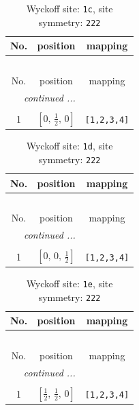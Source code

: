 \documentclass[fleqn,8pt]{jsarticle}
\begin{document}
\begin{longtable}{ccc}
\caption{Wyckoff site: {\tt 1c}, site symmetry: {\tt 222}}
 \\
 \hline \hline
No. & position & mapping \\ \hline \endfirsthead

\multicolumn{2}{l}{\tablename\ \thetable{}} \\
 \hline \hline
No. & position & mapping \\ \hline \endhead

 \hline \hline
\multicolumn{2}{r}{\footnotesize\it continued ...} \\ \endfoot

 \hline \hline
\multicolumn{2}{r}{} \\ \endlastfoot

1 & $\left[ 0,\, \frac{1}{2},\, 0 \right]$ & {\tt [1,2,3,4]} \\
\end{longtable}
\renewcommand{\arraystretch}{1.2}
\begin{longtable}{ccc}
\caption{Wyckoff site: {\tt 1d}, site symmetry: {\tt 222}}
 \\
 \hline \hline
No. & position & mapping \\ \hline \endfirsthead

\multicolumn{2}{l}{\tablename\ \thetable{}} \\
 \hline \hline
No. & position & mapping \\ \hline \endhead

 \hline \hline
\multicolumn{2}{r}{\footnotesize\it continued ...} \\ \endfoot

 \hline \hline
\multicolumn{2}{r}{} \\ \endlastfoot

1 & $\left[ 0,\, 0,\, \frac{1}{2} \right]$ & {\tt [1,2,3,4]} \\
\end{longtable}
\renewcommand{\arraystretch}{1.2}
\begin{longtable}{ccc}
\caption{Wyckoff site: {\tt 1e}, site symmetry: {\tt 222}}
 \\
 \hline \hline
No. & position & mapping \\ \hline \endfirsthead

\multicolumn{2}{l}{\tablename\ \thetable{}} \\
 \hline \hline
No. & position & mapping \\ \hline \endhead

 \hline \hline
\multicolumn{2}{r}{\footnotesize\it continued ...} \\ \endfoot

 \hline \hline
\multicolumn{2}{r}{} \\ \endlastfoot

1 & $\left[ \frac{1}{2},\, \frac{1}{2},\, 0 \right]$ & {\tt [1,2,3,4]} \\
\end{longtable}
\end{document}
